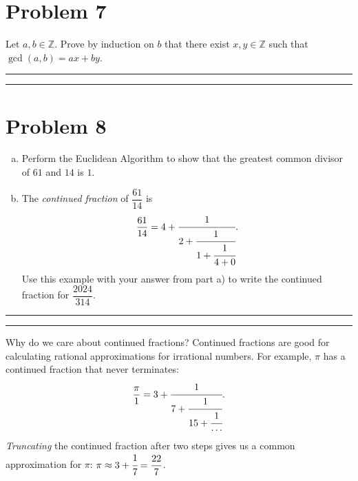 \documentclass{article}
\theoremstyle{definition}
\newenvironment{solution}{\bigskip\hrule{\hfill}}{\bigskip\hrule{\hfill}} %
\begin{document}

\section*{Problem 7}
Let $a,b\in\mathbb{Z}$. Prove by induction on $b$ that there exist $x,y\in\mathbb{Z}$ such that $\gcd\left(a,b\right)=ax+by$.
\begin{solution}


\end{solution}


\newpage


\section*{Problem 8}

\begin{enumerate}[a)] %
    \item  Perform the Euclidean Algorithm to show that the greatest common divisor of $61$ and $14$ is $1$.
    \item The \emph{continued fraction} of $\dfrac{61}{14}$ is $$\mathrm{\frac{61}{14}}=
4+\cfrac{1}{2+\cfrac{1}{1+\cfrac{1}{4+0}}}.$$ Use this example with your answer from part a) to write the continued fraction for $\dfrac{2024}{314}$.
\end{enumerate}



\begin{solution}


\end{solution}

\vfill

Why do we care about continued fractions? Continued fractions are good for calculating rational approximations for irrational numbers. For example, $\pi$ has a continued fraction that never terminates: $$\mathrm{\dfrac{\pi}{1}}=
3+\cfrac{1}{7+\cfrac{1}{15+\cfrac{1}{\cdots}}}.$$ \emph{Truncating} the continued fraction after two steps gives us a common approximation for $\pi$: $\pi\approx3+\cfrac{1}{7}=\dfrac{22}{7}$.
\end{document}
